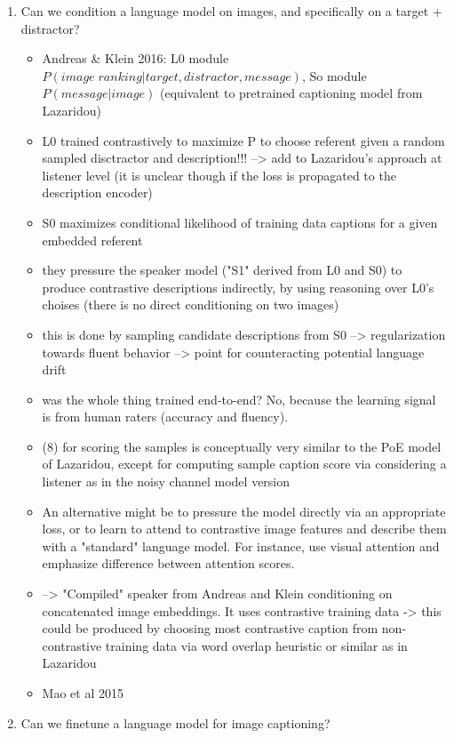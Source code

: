 \documentclass[11pt,letterpaper]{article}
\begin{document}
\begin{enumerate}
	\item Can we condition a language model on images, and specifically on a target + distractor?
	\begin{itemize}
		\item Andreas \& Klein 2016: L0 module $P(image \;ranking| target, distractor, message)$, So module $P(message|image)$ (equivalent to pretrained captioning model from Lazaridou)
		\item L0 trained contrastively to maximize P to choose referent given a random sampled disctractor and description!!! --> add to Lazaridou's approach at listener level (it is unclear though if the loss is propagated to the description encoder)
		\item S0 maximizes conditional likelihood of training data captions for a given embedded referent
		\item they pressure the speaker model ("S1" derived from L0 and S0) to produce contrastive descriptions indirectly, by using reasoning over L0's choises (there is no direct conditioning on two images)
		\item this is done by sampling candidate descriptions from S0 --> regularization towards fluent behavior --> point for counteracting potential language drift
		\item was the whole thing trained end-to-end? No, because the learning signal is from human raters (accuracy and fluency).
		\item (8) for scoring the samples is conceptually very similar to the PoE model of Lazaridou, except for computing sample caption score via considering a listener as in the noisy channel model version
		\item An alternative might be to pressure the model directly via an appropriate loss, or to learn to attend to contrastive image features and describe them with a "standard" language model. For instance, use visual attention and emphasize difference between attention scores. 
		\item --> "Compiled" speaker from Andreas and Klein conditioning on concatenated image embeddings. It uses contrastive training data -> this could be produced by choosing most contrastive caption from non-contrastive training data via word overlap heuristic or similar as in Lazaridou
		\item Mao et al 2015
	\end{itemize}
	\item Can we finetune a language model for image captioning?

\end{enumerate}
\end{document}
